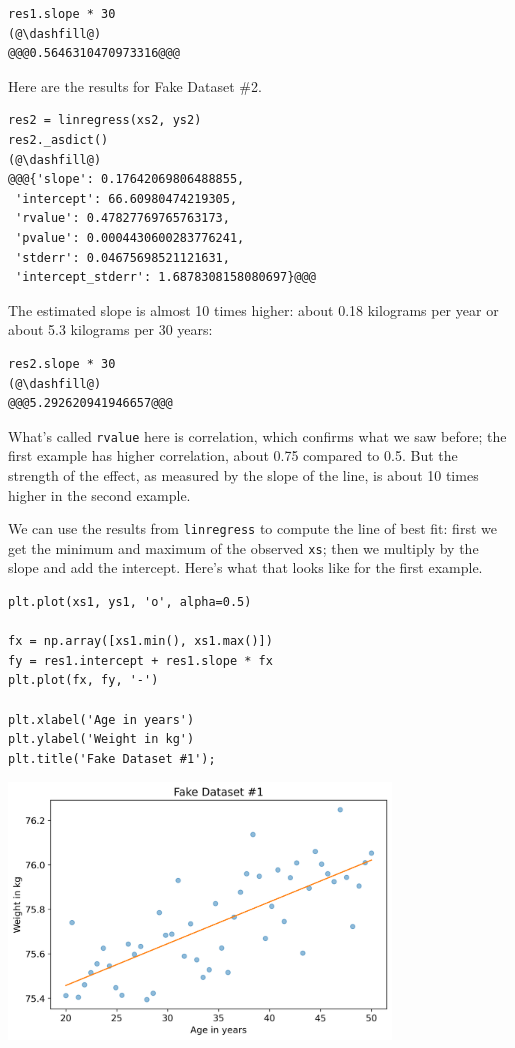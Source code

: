 \begin{lstlisting}[]
res1.slope * 30
(@\dashfill@)
@@@0.5646310470973316@@@
\end{lstlisting}

Here are the results for Fake Dataset \#2.

\begin{lstlisting}[]
res2 = linregress(xs2, ys2)
res2._asdict()
(@\dashfill@)
@@@{'slope': 0.17642069806488855,
 'intercept': 66.60980474219305,
 'rvalue': 0.47827769765763173,
 'pvalue': 0.0004430600283776241,
 'stderr': 0.04675698521121631,
 'intercept_stderr': 1.6878308158080697}@@@
\end{lstlisting}

The estimated slope is almost 10 times higher: about 0.18 kilograms per
year or about 5.3 kilograms per 30 years:

\begin{lstlisting}[]
res2.slope * 30
(@\dashfill@)
@@@5.292620941946657@@@
\end{lstlisting}

What's called \passthrough{\lstinline!rvalue!} here is correlation,
which confirms what we saw before; the first example has higher
correlation, about 0.75 compared to 0.5. But the strength of the effect,
as measured by the slope of the line, is about 10 times higher in the
second example.

We can use the results from \passthrough{\lstinline!linregress!} to
compute the line of best fit: first we get the minimum and maximum of
the observed \passthrough{\lstinline!xs!}; then we multiply by the slope
and add the intercept. Here's what that looks like for the first
example.

\begin{lstlisting}[]
plt.plot(xs1, ys1, 'o', alpha=0.5)

fx = np.array([xs1.min(), xs1.max()])
fy = res1.intercept + res1.slope * fx
plt.plot(fx, fy, '-')

plt.xlabel('Age in years')
plt.ylabel('Weight in kg')
plt.title('Fake Dataset #1');
\end{lstlisting}

\begin{center}
\includegraphics[width=4in]{chapters/09_relationships_files/09_relationships_87_0.png}
\end{center}

